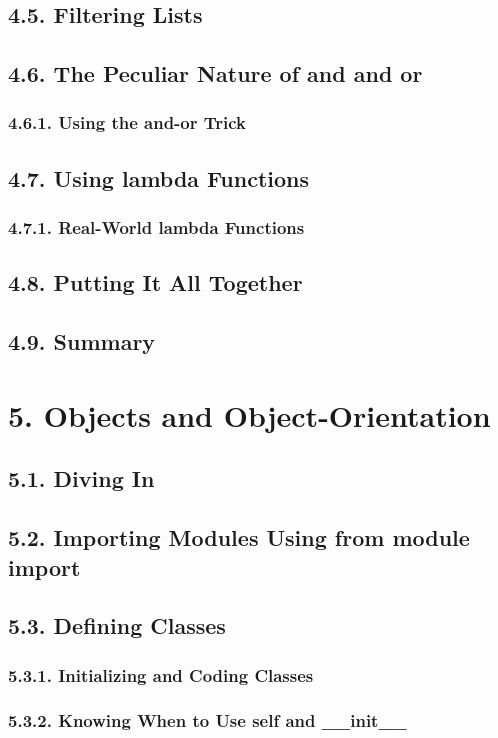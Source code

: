\documentclass[oneside,12pt]{book}
\begin{document}
\section{4.5. Filtering Lists}
\section{4.6. The Peculiar Nature of and and or}
\subsection{4.6.1. Using the and-or Trick}
       
\section{4.7. Using lambda Functions}
\subsection{4.7.1. Real-World lambda Functions}
       
\section{4.8. Putting It All Together}
\section{4.9. Summary}
   
\chapter{5. Objects and Object-Orientation}
\section{5.1. Diving In}
\section{5.2. Importing Modules Using from module import}
\section{5.3. Defining Classes}
\subsection{5.3.1. Initializing and Coding Classes}
\subsection{5.3.2. Knowing When to Use self and \_\_init\_\_}
       
\end{document}
